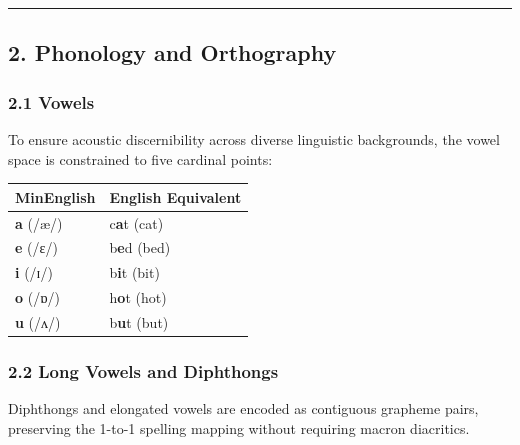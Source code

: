 \begin{center}\rule{0.5\linewidth}{0.5pt}\end{center}

\newpage

\subsection{2. Phonology and
Orthography}\label{phonology-and-orthography}

\subsubsection{2.1 Vowels}\label{vowels}

To ensure acoustic discernibility across diverse linguistic backgrounds,
the vowel space is constrained to five cardinal points:

{\def\LTcaptype{} %
\begin{longtable}[]{@{}ll@{}}
\toprule\noalign{}
MinEnglish & English Equivalent \\
\midrule\noalign{}
\endhead
\bottomrule\noalign{}
\endlastfoot
\textbf{a} (/æ/) & c\textbf{a}t (cat) \\
\textbf{e} (/ɛ/) & b\textbf{e}d (bed) \\
\textbf{i} (/ɪ/) & b\textbf{i}t (bit) \\
\textbf{o} (/ɒ/) & h\textbf{o}t (hot) \\
\textbf{u} (/ʌ/) & b\textbf{u}t (but) \\
\end{longtable}
}

\subsubsection{2.2 Long Vowels and
Diphthongs}\label{long-vowels-and-diphthongs}

Diphthongs and elongated vowels are encoded as contiguous grapheme
pairs, preserving the 1-to-1 spelling mapping without requiring macron
diacritics.

